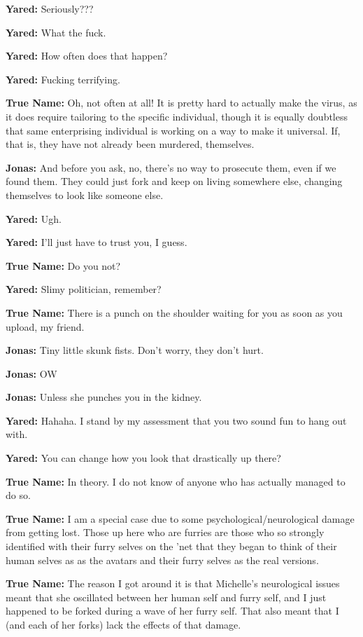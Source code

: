 \textbf{Yared:} Seriously???

\textbf{Yared:} What the fuck.

\textbf{Yared:} How often does that happen?

\textbf{Yared:} Fucking terrifying.

\textbf{True Name:} Oh, not often at all! It is pretty hard to actually make the virus, as it does require tailoring to the specific individual, though it is equally doubtless that same enterprising individual is working on a way to make it universal. If, that is, they have not already been murdered, themselves.

\textbf{Jonas:} And before you ask, no, there's no way to prosecute them, even if we found them. They could just fork and keep on living somewhere else, changing themselves to look like someone else.

\textbf{Yared:} Ugh.

\textbf{Yared:} I'll just have to trust you, I guess.

\textbf{True Name:} Do you not?

\textbf{Yared:} Slimy politician, remember?

\textbf{True Name:} There is a punch on the shoulder waiting for you as soon as you upload, my friend.

\textbf{Jonas:} Tiny little skunk fists. Don't worry, they don't hurt.

\textbf{Jonas:} OW

\textbf{Jonas:} Unless she punches you in the kidney.

\textbf{Yared:} Hahaha. I stand by my assessment that you two sound fun to hang out with.

\textbf{Yared:} You can change how you look that drastically up there?

\textbf{True Name:} In theory. I do not know of anyone who has actually managed to do so.

\textbf{True Name:} I am a special case due to some psychological/neurological damage from getting lost. Those up here who are furries are those who so strongly identified with their furry selves on the 'net that they began to think of their human selves as as the avatars and their furry selves as the real versions.

\textbf{True Name:} The reason I got around it is that Michelle's neurological issues meant that she oscillated between her human self and furry self, and I just happened to be forked during a wave of her furry self. That also meant that I (and each of her forks) lack the effects of that damage.

